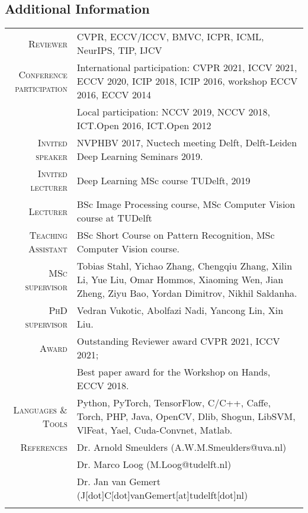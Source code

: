 \documentclass[a4paper, oneside, final]{scrartcl}
\begin{document}
\begin{center}
		\section{Additional Information}
		\begin{tabular}{r@{\hskip 0.3in}p{11.3cm}}
            \textsc{Reviewer}                   & CVPR, ECCV/ICCV, BMVC, ICPR, ICML, NeurIPS, TIP, IJCV\\
            \textsc{Conference participation}   & International participation: CVPR 2021, ICCV 2021, ECCV 2020, ICIP 2018, ICIP 2016, workshop ECCV 2016, ECCV 2014\\
                                                & Local participation: NCCV 2019, NCCV 2018, ICT.Open 2016, ICT.Open 2012\\
            \textsc{Invited speaker}            & NVPHBV 2017, Nuctech meeting Delft, Delft-Leiden Deep Learning Seminars 2019.\\
            \textsc{Invited lecturer}           & Deep Learning MSc course TUDelft, 2019\\
			\textsc{Lecturer}		            & BSc Image Processing course, MSc Computer Vision course at TUDelft\\
            \textsc{Teaching Assistant}         & BSc Short Course on Pattern Recognition, MSc Computer Vision course.\\ 
			\textsc{MSc supervisor}             & Tobias Stahl, Yichao Zhang, Chengqiu Zhang, Xilin Li, Yue Liu, Omar Hommos, Xiaoming Wen, Jian Zheng, Ziyu Bao, Yordan Dimitrov, Nikhil Saldanha.\\
			\textsc{PhD supervisor}             & Vedran Vukotic, Abolfazi Nadi, Yancong Lin, Xin Liu.\\[5px] 
            \textsc{Award}                      & Outstanding Reviewer award CVPR 2021, ICCV 2021;\\ 
                                                & Best paper award for the Workshop on Hands, ECCV 2018.\\  
			\textsc{Languages \& Tools}         & Python, PyTorch, TensorFlow, C\slash C++, Caffe, Torch, PHP, 
                                                Java, OpenCV, Dlib, Shogun, LibSVM, VlFeat, Yael, Cuda-Convnet, Matlab.\\

			\textsc{References} & Dr. Arnold Smeulders (A.W.M.Smeulders@uva.nl)\\
                                & Dr. Marco Loog (M.Loog@tudelft.nl)\\
                                & Dr. Jan van Gemert (J[dot]C[dot]vanGemert[at]tudelft[dot]nl)\\
			\multicolumn{2}{c}{}\\
		\end{tabular}
	\end{center}
\end{document}
